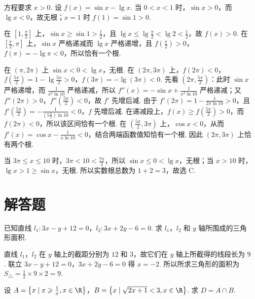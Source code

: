 \begin{solution}
方程要求 \(x>0\). 设 \(f(x)=\sin x-\lg x\). 当 \(0<x<1\) 时，\(\sin x>0\)，而 \(\lg x<0\)，故无根；\(x=1\) 时 \(f(1)=\sin1>0\).

在 \([1,\frac\pi2]\) 上，\(\sin x\geqslant\sin1>\frac12\)，且 \(\lg x\leqslant\lg\frac\pi2<\lg2<\frac12\)，故 \(f(x)>0\). 在 \([\frac\pi2,\pi]\) 上，\(\sin x\) 严格递减而 \(\lg x\) 严格递增，且 \(f(\frac\pi2)>0\)，\(f(\pi)=-\lg\pi<0\)，所以恰有一个根.

在 \((\pi,2\pi)\) 上 \(\sin x<0<\lg x\)，无根. 在 \((2\pi,3\pi)\) 上，\(f(2\pi)<0\)，\(f(\frac{5\pi}{2})=1-\lg\frac{5\pi}{2}>0\)，\(f(3\pi)=-\lg(3\pi)<0\). 先看 \((2\pi,\frac{5\pi}{2})\)：此时 \(\sin x\) 严格递增，而 \(\frac1{x^2\ln10}\) 严格递减，所以 \(f''(x)=-\sin x+\frac1{x^2\ln10}\) 严格递减；又 \(f''(2\pi)>0\)，\(f''(\frac{5\pi}{2})<0\)，故 \(f'\) 先增后减. 由于 \(f'(2\pi)=1-\frac1{2\pi\ln10}>0\)，且 \(f'(\frac{5\pi}{2})=-\frac1{(5\frac{\pi}{2})\ln10}<0\)，\(f\) 先增后减. 在递减段上，\(f(x)\geqslant f(\frac{5\pi}{2})>0\)，而 \(f(2\pi)<0\)，所以该区间恰有一个根. 在 \((\frac{5\pi}{2},3\pi)\) 上，\(\cos x<0\)，从而 \(f'(x)=\cos x-\frac1{x\ln10}<0\)，结合两端函数值知恰有一个根. 因此 \((2\pi,3\pi)\) 上恰有两个根.

当 \(3\pi\leqslant x\leqslant10\) 时，\(3\pi<10<\frac{7\pi}{2}\)，所以 \(\sin x\leqslant0<\lg x\)，无根；当 \(x>10\) 时，\(\lg x>1\geqslant\sin x\)，无根. 所以实数根总数为 \(1+2=3\)，故选 C.
\end{solution}

\section{解答题}

\begin{problem}
已知直线 \(l_1:3x-y+12=0\)，\(l_2:3x+2y-6=0\). 求 \(l_1\)，\(l_2\) 和 \(y\) 轴所围成的三角形面积.
\end{problem}

\begin{solution}
直线 \(l_1\)，\(l_2\) 在 \(y\) 轴上的截距分别为 \(12\) 和 \(3\)，故它们在 \(y\) 轴上所截得的线段长为 \(9\). 联立 \(3x-y+12=0\)，\(3x+2y-6=0\) 得 \(x=-2\). 所以所求三角形的面积为 \(S_{\triangle}=\frac{1}{2}\times9\times2=9\).
\end{solution}

\begin{problem}
设 \(A=\left\{ x\mid x\geqslant\frac{1}{x},x\in\R \right\}\)，\(B=\left\{ x\mid \sqrt{2x+1}<3,x\in\R \right\}\). 求 \(D=A\cap B\).
\end{problem}

